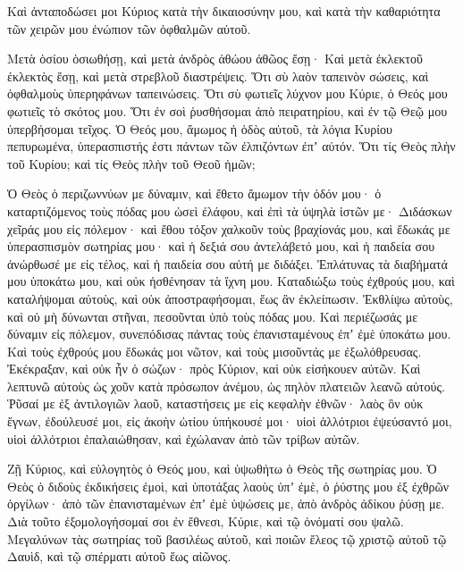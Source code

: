 {Καὶ ἀνταποδώσει μοι Κύριος κατὰ τὴν δικαιοσύνην μου, καὶ κατὰ τὴν καθαριότητα τῶν χειρῶν μου ἐνώπιον τῶν ὀφθαλμῶν αὐτοῦ.
\par }{\PP {}Μετὰ ὁσίου ὁσιωθήσῃ, καὶ μετὰ ἀνδρὸς ἀθώου ἀθῶος ἔσῃ·
Καὶ μετὰ ἐκλεκτοῦ ἐκλεκτὸς ἔσῃ, καὶ μετὰ στρεβλοῦ διαστρέψεις.
Ὅτι σὺ λαὸν ταπεινὸν σώσεις, καὶ ὀφθαλμοὺς ὑπερηφάνων ταπεινώσεις.
Ὅτι σὺ φωτιεῖς λύχνον μου Κύριε, ὁ Θεός μου φωτιεῖς τὸ σκότος μου.
Ὅτι ἐν σοὶ ῥυσθήσομαι ἀπὸ πειρατηρίου, καὶ ἐν τῷ Θεῷ μου ὑπερβήσομαι τεῖχος.
Ὁ Θεός μου, ἄμωμος ἡ ὁδὸς αὐτοῦ, τὰ λόγια Κυρίου πεπυρωμένα, ὑπερασπιστής ἐστι πάντων τῶν ἐλπιζόντων ἐπʼ αὐτόν.
Ὅτι τίς Θεὸς πλὴν τοῦ Κυρίου; καὶ τίς Θεὸς πλὴν τοῦ Θεοῦ ἡμῶν;
\par }{\PP {}Ὁ Θεὸς ὁ περιζωννύων με δύναμιν, καὶ ἔθετο ἄμωμον τὴν ὁδόν μου·
ὁ καταρτιζόμενος τοὺς πόδας μου ὡσεὶ ἐλάφου, καὶ ἐπὶ τὰ ὑψηλὰ ἱστῶν με·
Διδάσκων χεῖράς μου εἰς πόλεμον· καὶ ἔθου τόξον χαλκοῦν τοὺς βραχίονάς μου,
καὶ ἔδωκάς με ὑπερασπισμὸν σωτηρίας μου· καὶ ἡ δεξιά σου ἀντελάβετό μου, καὶ ἡ παιδεία σου ἀνώρθωσέ με εἰς τέλος, καὶ ἡ παιδεία σου αὐτή με διδάξει.
Ἐπλάτυνας τὰ διαβήματά μου ὑποκάτω μου, καὶ οὐκ ἠσθένησαν τὰ ἴχνη μου.
Καταδιώξω τοὺς ἐχθρούς μου, καὶ καταλήψομαι αὐτοὺς, καὶ οὐκ ἀποστραφήσομαι, ἕως ἂν ἐκλείπωσιν.
Ἐκθλίψω αὐτοὺς, καὶ οὐ μὴ δύνωνται στῆναι, πεσοῦνται ὑπὸ τοὺς πόδας μου.
Καὶ περιέζωσάς με δύναμιν εἰς πόλεμον, συνεπόδισας πάντας τοὺς ἐπανισταμένους ἐπʼ ἐμὲ ὑποκάτω μου.
Καὶ τοὺς ἐχθρούς μου ἔδωκάς μοι νῶτον, καὶ τοὺς μισοῦντάς με ἐξωλόθρευσας.
Ἐκέκραξαν, καὶ οὐκ ἦν ὁ σώζων· πρὸς Κύριον, καὶ οὐκ εἰσήκουεν αὐτῶν.
Καὶ λεπτυνῶ αὐτοὺς ὡς χοῦν κατὰ πρόσωπον ἀνέμου, ὡς πηλὸν πλατειῶν λεανῶ αὐτούς.
Ῥῦσαί με ἐξ ἀντιλογιῶν λαοῦ, καταστήσεις με εἰς κεφαλὴν ἐθνῶν· λαὸς ὃν οὐκ ἔγνων, ἐδούλευσέ μοι,
εἰς ἀκοὴν ὠτίου ὑπήκουσέ μοι· υἱοὶ ἀλλότριοι ἐψεύσαντό μοι,
υἱοὶ ἀλλότριοι ἐπαλαιώθησαν, καὶ ἐχώλαναν ἀπὸ τῶν τρίβων αὐτῶν.
\par }{\PP {}Ζῇ Κύριος, καὶ εὐλογητὸς ὁ Θεός μου, καὶ ὑψωθήτω ὁ Θεὸς τῆς σωτηρίας μου.
Ὁ Θεὸς ὁ διδοὺς ἐκδικήσεις ἐμοὶ, καὶ ὑποτάξας λαοὺς ὑπʼ ἐμὲ,
ὁ ῥύστης μου ἐξ ἐχθρῶν ὀργίλων· ἀπὸ τῶν ἐπανισταμένων ἐπʼ ἐμὲ ὑψώσεις με, ἀπὸ ἀνδρὸς ἀδίκου ῥύσῃ με.
Διὰ τοῦτο ἐξομολογήσομαί σοι ἐν ἔθνεσι, Κύριε, καὶ τῷ ὀνόματί σου ψαλῶ.
Μεγαλύνων τὰς σωτηρίας τοῦ βασιλέως αὐτοῦ, καὶ ποιῶν ἔλεος τῷ χριστῷ αὐτοῦ τῷ Δαυὶδ, καὶ τῷ σπέρματι αὐτοῦ ἕως αἰῶνος.

}
